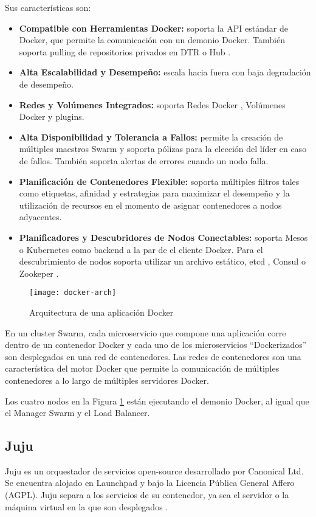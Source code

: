 Sus características son:
\begin{itemize}
\item \textbf{Compatible con Herramientas Docker: } soporta la API estándar de Docker, que permite la comunicación con un demonio Docker. También soporta pulling de repositorios privados en DTR  \cite{Docker2016-is} o Hub \cite{Docker2016-ev}.
\item \textbf{Alta Escalabilidad y Desempeño: }escala hacia fuera con baja degradación de desempeño. 
\item \textbf{Redes y Volúmenes Integrados: }soporta Redes Docker \cite{Docker2016-dm}, Volúmenes Docker \cite{Docker2016-mi} y plugins.
\item \textbf{Alta Disponibilidad y Tolerancia a Fallos: }permite la creación de múltiples maestros Swarm y soporta pólizas para la elección del líder en caso de fallos. También soporta alertas de errores cuando un nodo falla.
\item \textbf{Planificación de Contenedores Flexible: }soporta múltiples filtros tales como etiquetas, afinidad y estrategias para maximizar el desempeño y la utilización de recursos en el momento de asignar contenedores a nodos adyacentes.
\item \textbf{Planificadores y Descubridores de Nodos Conectables: }soporta Mesos o Kubernetes como backend a la par de el cliente Docker. Para el descubrimiento de nodos soporta utilizar un archivo estático, etcd \cite{Coreos2016-ep}, Consul \cite{HashiCorp2016-ei} o Zookeper \cite{Apache2016-oo}.

\end{itemize}

\begin{figure}[H]
    \centering
    \texttt{[image: docker-arch]}
    \caption{ Arquitectura de una aplicación Docker \protect\cite{Docker2016-pk}}
    \label{fig:docker-arch}
\end{figure}
En un cluster Swarm, cada microservicio que compone una aplicación corre dentro de un contenedor Docker y cada uno de los microservicios “Dockerizados” son desplegados en una red de contenedores. Las redes de contenedores son una característica del motor Docker que permite la comunicación de múltiples contenedores a lo largo de múltiples servidores Docker. 

Los cuatro nodos en la Figura \ref{fig:docker-arch} están ejecutando el demonio Docker, al igual que el Manager Swarm y el Load Balancer.


\subsection{Juju}
Juju es un orquestador de servicios open-source desarrollado por Canonical Ltd. Se encuentra alojado en Launchpad y bajo la Licencia Pública General Affero (AGPL). Juju separa a los servicios de su contenedor, ya sea el servidor o la máquina virtual en la que son desplegados \cite{Canonical2016-qx}. 

